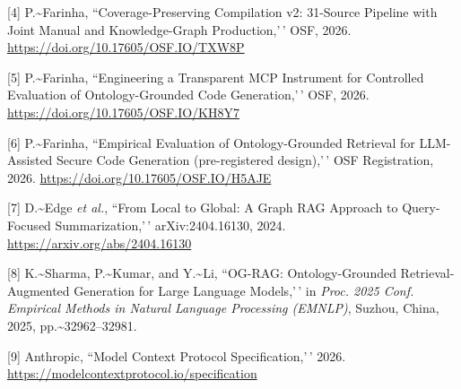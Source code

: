 \documentclass[conference]{IEEEtran}
\begin{document}
{[}4{]} P.\textasciitilde Farinha, ``Coverage-Preserving Compilation v2:
31-Source Pipeline with Joint Manual and Knowledge-Graph Production,'\,'
OSF, 2026. \url{https://doi.org/10.17605/OSF.IO/TXW8P}

{[}5{]} P.\textasciitilde Farinha, ``Engineering a Transparent MCP
Instrument for Controlled Evaluation of Ontology-Grounded Code
Generation,'\,' OSF, 2026. \url{https://doi.org/10.17605/OSF.IO/KH8Y7}

{[}6{]} P.\textasciitilde Farinha, ``Empirical Evaluation of
Ontology-Grounded Retrieval for LLM-Assisted Secure Code Generation
(pre-registered design),'\,' OSF Registration, 2026.
\url{https://doi.org/10.17605/OSF.IO/H5AJE}

{[}7{]} D.\textasciitilde Edge \emph{et al.}, ``From Local to Global: A
Graph RAG Approach to Query-Focused Summarization,'\,' arXiv:2404.16130,
2024. \url{https://arxiv.org/abs/2404.16130}

{[}8{]} K.\textasciitilde Sharma, P.\textasciitilde Kumar, and
Y.\textasciitilde Li, ``OG-RAG: Ontology-Grounded Retrieval-Augmented
Generation for Large Language Models,'\,' in
\emph{Proc. 2025 Conf. Empirical Methods in Natural Language Processing (EMNLP)},
Suzhou, China, 2025, pp.\textasciitilde32962--32981.

{[}9{]} Anthropic, ``Model Context Protocol Specification,'\,' 2026.
\url{https://modelcontextprotocol.io/specification}
\end{document}
